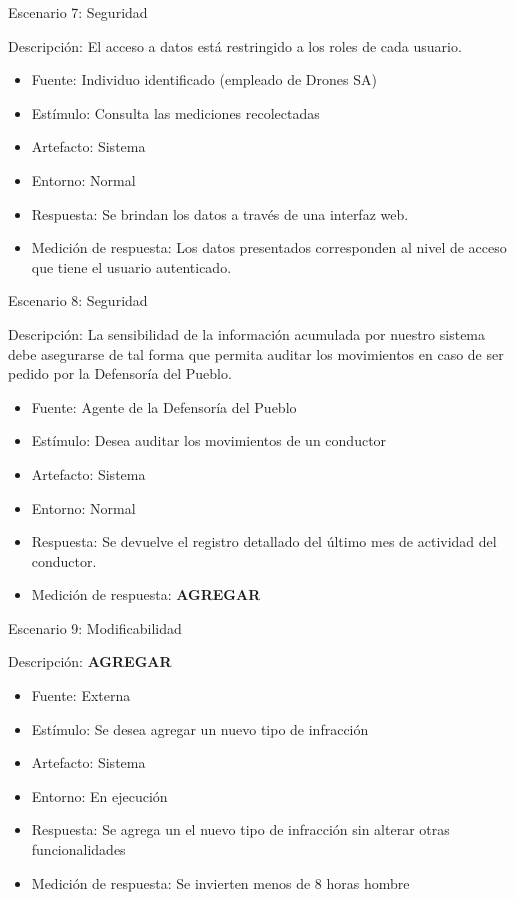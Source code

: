 Escenario 7: Seguridad


Descripción: El acceso a datos está restringido a los roles de cada usuario.
\begin{itemize}
\item Fuente: Individuo identificado (empleado de Drones SA)
\item Estímulo: Consulta las mediciones recolectadas
\item Artefacto: Sistema
\item Entorno: Normal
\item Respuesta: Se brindan los datos a través de una interfaz web. 
\item Medición de respuesta: Los datos presentados corresponden al nivel de acceso que tiene el usuario autenticado.
\end{itemize} 

Escenario 8: Seguridad


Descripción: La sensibilidad de la información acumulada por nuestro sistema debe asegurarse de tal forma que permita auditar los movimientos en caso de ser pedido por la Defensoría del Pueblo.
\begin{itemize}
\item Fuente: Agente de la Defensoría del Pueblo
\item Estímulo: Desea auditar los movimientos de un conductor
\item Artefacto: Sistema
\item Entorno: Normal
\item Respuesta: Se devuelve el registro detallado del último mes de actividad del conductor. 
\item Medición de respuesta: \textbf{AGREGAR}
\end{itemize} 

Escenario 9: Modificabilidad


Descripción: \textbf{AGREGAR}
\begin{itemize}
\item Fuente: Externa
\item Estímulo: Se desea agregar un nuevo tipo de infracción
\item Artefacto: Sistema
\item Entorno: En ejecución
\item Respuesta: Se agrega un el nuevo tipo de infracción sin alterar otras funcionalidades 
\item Medición de respuesta: Se invierten menos de 8 horas hombre
\end{itemize} 

